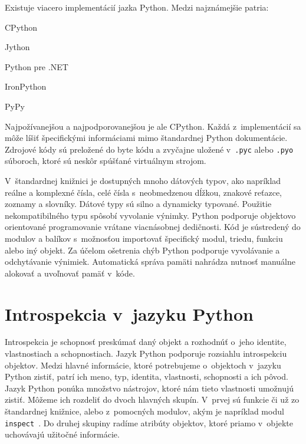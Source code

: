 \documentclass[11pt,oneside,final]{fithesis2}
\begin{document}
Existuje viacero implementácií jazka Python. Medzi najznámejšie patria:
\begin{list}{•}{}
\item CPython
\item Jython
\item Python pre .NET
\item IronPython
\item PyPy
\end{list}

Najpožívanejšou a najpodporovanejšou je ale CPython. Každá z~implementácií sa môže líšiť špecifickými informáciami mimo štandardnej Python dokumentácie.
Zdrojové kódy sú preložené do byte kódu a zvyčajne uložené v~\texttt{.pyc} alebo \texttt{.pyo} súboroch, ktoré sú neskôr spúšťané virtuálnym strojom.

	V~štandardnej knižnici je dostupných mnoho dátových typov, ako napríklad reálne a komplexné čísla, celé čísla s~neobmedzenou dĺžkou, znakové reťazce, zoznamy a slovníky. Dátové typy sú silno a dynamicky typované. Použitie nekompatibilného typu spôsobí vyvolanie výnimky. Python podporuje objektovo orientované programovanie vrátane viacnásobnej dedičnosti. Kód je sústredený do modulov a balíkov s~možnosťou importovať špecifický modul, triedu, funkciu alebo iný objekt. Za účelom ošetrenia chýb Python podporuje vyvolávanie a odchytávanie výnimiek. Automatická správa pamäti nahrádza nutnosť manuálne alokovať a uvoľnovať pamäť v~kóde.~\cite{pythonintro}


	\section{Introspekcia v~jazyku Python}
		Introspekcia je schopnosť preskúmať daný objekt a rozhodnúť o~jeho identite, vlastnostiach a schopnostiach. Jazyk Python podporuje rozsiahlu introspekciu objektov. Medzi hlavné informácie, ktoré potrebujeme o~objektoch v~jazyku Python zistiť, patrí ich meno, typ, identita, vlastnosti, schopnosti a ich pôvod. Jazyk Python ponúka množstvo nástrojov, ktoré nám tieto vlastnosti umožnujú zistiť. Môžeme ich rozdeliť do dvoch hlavných skupín. V~prvej sú funkcie či už zo štandardnej knižnice, alebo z~pomocných modulov, akým je napríklad modul \texttt{inspect}~\cite{inspectmodule}. Do druhej skupiny radíme atribúty objektov, ktoré priamo v~objekte uchovávajú užitočné informácie.
		
\end{document}
